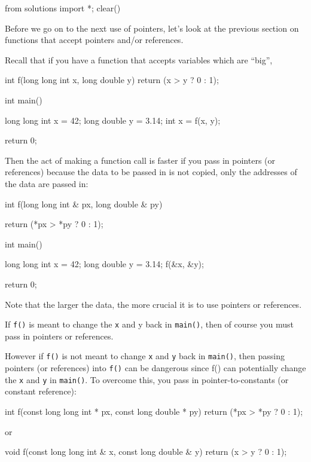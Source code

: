 \begin{python0}
from solutions import *; clear()
\end{python0}

Before we go on to the next use of pointers, let's look at the previous section on functions that accept pointers and/or references.

Recall that if you have a function that accepts variables which are ``big'',

\begin{consolethree}[escapeinside=||]
int f(long long int x, long double y)
{
    return (x > y ? 0 : 1);
}

int main()
{
    long long int x = 42;
    long double y = 3.14;
    int x = f(x, y);

    return 0;
}
\end{consolethree}
Then the act of making a function call is faster if you pass in pointers (or references) because the data to be passed in is not copied, only the addresses of the data are passed in:

\begin{consolethree}[escapeinside=||]
int f(long long int & px, long double & py)
{
    return (*px > *py ? 0 : 1);

}

int main()
{
    long long int x = 42;
    long double y = 3.14;
    f(&x, &y);

    return 0;
}
\end{consolethree}
Note that the larger the data, the more crucial it is to use pointers or references.

If \texttt{f()} is meant to change the \texttt{x} and y back in \texttt{main()}, then of course you must pass in pointers or references.

However if \texttt{f()} is not meant to change \texttt{x} and \texttt{y} back in \texttt{main()}, then passing pointers (or references) into \texttt{f()} can be dangerous since f() can potentially change the \texttt{x} and \texttt{y} in \texttt{main()}. To overcome this, you pass in pointer-to-constants (or constant reference):

\begin{consolethree}[escapeinside=||]
int f(const long long int * px,
      const long double * py)
{
    return (*px > *py ? 0 : 1);
}
\end{consolethree}
or

\begin{consolethree}[escapeinside=||]
void f(const long long int & x,
       const long double & y)
{
    return (x > y ? 0 : 1);
}
\end{consolethree}

